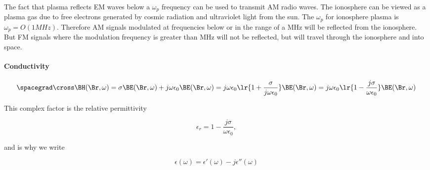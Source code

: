 The fact that plasma reflects EM waves below a \( \omega_p \) frequency can be used to transmit AM radio waves.  The ionosphere can be viewed as a plasma gas due to free electrons generated by cosmic radiation and ultraviolet light from the sun.  The \( \omega_p \) for ionosphere plasma is \( \omega_p = O(1 \si{MHz}) \).  Therefore AM signals modulated at frequencies below or in the range of a \si{MHz} will be reflected from the ionosphere.  But FM signals where the modulation frequency is greater than \si{MHz} will not be reflected, but will travel through the ionosphere and into space.

\paragraph{Conductivity}


\begin{dmath}\label{eqn:druid:260}
\spacegrad \cross \BH(\Br, \omega) 
= \sigma \BE(\Br, \omega) + j \omega \epsilon_0 \BE(\Br, \omega)
= j \omega \epsilon_0 \lr{ 1 + \frac{\sigma}{j \omega \epsilon_0} } \BE(\Br, \omega)
= j \omega \epsilon_0 \lr{ 1 - \frac{j \sigma}{\omega \epsilon_0} } \BE(\Br, \omega)
\end{dmath}

This complex factor is the relative permittivity

\begin{dmath}\label{eqn:druid:280}
\epsilon_r  
= 1 - \frac{j \sigma}{\omega \epsilon_0},
\end{dmath}

and is why we write

\begin{dmath}\label{eqn:druid:300}
\epsilon(\omega) = \epsilon'(\omega) - j \epsilon''(\omega) 
\end{dmath}

